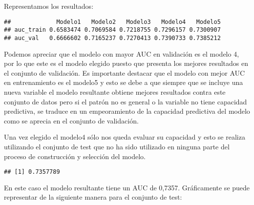 \documentclass[]{article}
\newenvironment{Shaded}{\begin{snugshade}}{\end{snugshade}}
\newcommand{\KeywordTok}[1]{\textcolor[rgb]{0.13,0.29,0.53}{\textbf{#1}}}
\newcommand{\DataTypeTok}[1]{\textcolor[rgb]{0.13,0.29,0.53}{#1}}
\newcommand{\StringTok}[1]{\textcolor[rgb]{0.31,0.60,0.02}{#1}}
\newcommand{\OtherTok}[1]{\textcolor[rgb]{0.56,0.35,0.01}{#1}}
\newcommand{\OperatorTok}[1]{\textcolor[rgb]{0.81,0.36,0.00}{\textbf{#1}}}
\newcommand{\NormalTok}[1]{#1}
\begin{document}
Representamos los resultados:

\begin{verbatim}
##             Modelo1   Modelo2   Modelo3   Modelo4   Modelo5
## auc_train 0.6583474 0.7069584 0.7218755 0.7296157 0.7300907
## auc_val   0.6666602 0.7165237 0.7270413 0.7390733 0.7385212
\end{verbatim}

Podemos apreciar que el modelo con mayor AUC en validación es el modelo
4, por lo que este es el modelo elegido puesto que presenta los mejores
resultados en el conjunto de validación. Es importante destacar que el
modelo con mejor AUC en entrenamiento es el modelo5 y esto se debe a que
siempre que se incluye una nueva variable el modelo resultante obtiene
mejores resultados contra este conjunto de datos pero si el patrón no es
general o la variable no tiene capacidad predictiva, se traduce en un
empeoramiento de la capacidad predictiva del modelo como se aprecia en
el conjunto de validación.

Una vez elegido el modelo4 sólo nos queda evaluar su capacidad y esto se
realiza utilizando el conjunto de test que no ha sido utilizado en
ninguna parte del proceso de construcción y selección del modelo.

\begin{Shaded}
\end{Shaded}

\begin{verbatim}
## [1] 0.7357789
\end{verbatim}

En este caso el modelo resultante tiene un AUC de 0,7357. Gráficamente
se puede representar de la siguiente manera para el conjunto de test:
\end{document}
